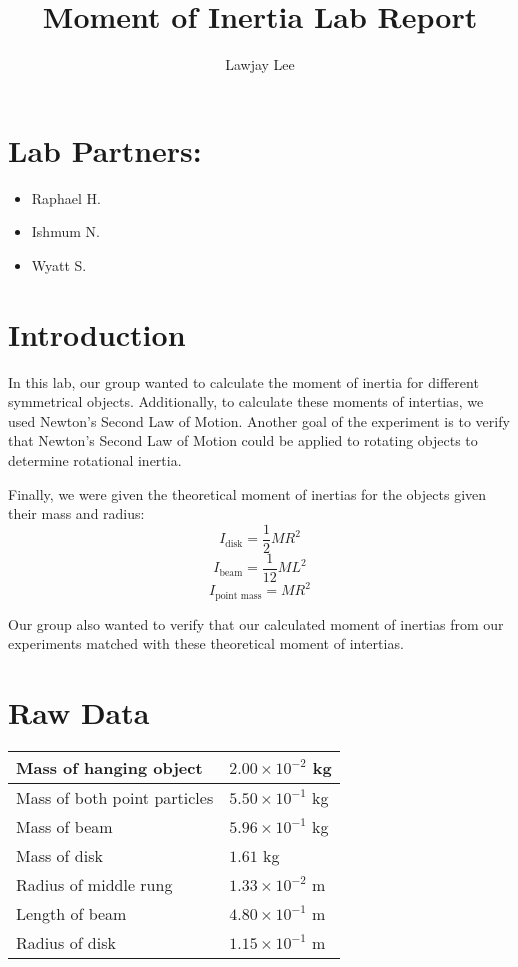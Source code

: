 \documentclass[fleqn]{article}
\title{Moment of Inertia Lab Report}
\author{Lawjay Lee}
\date{}
\begin{document}
\setlength{\mathindent}{0pt}
\maketitle

\section*{Lab Partners:}
\begin{itemize}
	\item Raphael H.
	\item Ishmum N.
	\item Wyatt S.
\end{itemize}

\section*{Introduction}
In this lab, our group wanted to calculate the moment of inertia for different symmetrical objects. Additionally, to calculate these moments of intertias, we used Newton's Second Law of Motion. Another goal of the experiment is to verify that Newton's Second Law of Motion could be applied to rotating objects to determine rotational inertia.

Finally, we were given the theoretical moment of inertias for the objects given their mass and radius:
\[ I _{\text{disk} } =\frac{1}{2} MR^2 \]
\[ I _{\text{beam} } = \frac{1}{12} ML^2 \]
\[ I _{\text{point mass} } = MR^2 \]

Our group also wanted to verify that our calculated moment of inertias from our experiments matched with these theoretical moment of intertias.

\section*{Raw Data}
\begin{table}[H]
	\centering
	\setlength{\extrarowheight}{2pt}
	\begin{tabularx}{\textwidth}{|X|X|}
		\hline
		Mass of hanging object       & $2.00 \times 10^{-2}$ kg \\
		\hline
		Mass of both point particles & $5.50 \times 10^{-1}$ kg \\
		\hline
		Mass of beam                 & $5.96 \times 10^{-1}$ kg \\
		\hline
		Mass of disk                 & $1.61$ kg                \\
		\hline
		Radius of middle rung        & $1.33 \times 10^{-2}$ m  \\
		\hline
		Length of beam               & $4.80 \times 10^{-1}$ m  \\
		\hline
		Radius of disk               & $1.15 \times 10^{-1}$ m  \\
		\hline
	\end{tabularx}
\end{table}
\end{document}
